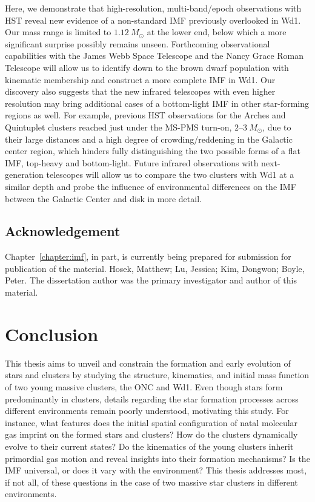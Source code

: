 \documentclass[12pt]{ucsddissertation}
\begin{document}
\begin{CJK*}{UTF8}{gbsn}
Here, we demonstrate that high-resolution, multi-band/epoch observations with HST reveal new evidence of a non-standard IMF previously overlooked in Wd1. Our mass range is limited to $1.12~M_\odot$ at the lower end, below which a more significant surprise possibly remains unseen. Forthcoming observational capabilities with the James Webb Space Telescope and the Nancy Grace Roman Telescope will allow us to identify down to the brown dwarf population with kinematic membership and construct a more complete IMF in Wd1. Our discovery also suggests that the new infrared telescopes with even higher resolution may bring additional cases of a bottom-light IMF in other star-forming regions as well. For example, previous HST observations for the Arches and Quintuplet clusters reached just under the MS-PMS turn-on, $2$--$3~M_\odot$, due to their large distances and a high degree of crowding/reddening in the Galactic center region, which hinders fully distinguishing the two possible forms of a flat IMF, top-heavy and bottom-light. Future infrared observations with next-generation telescopes will allow us to compare the two clusters with Wd1 at a similar depth and probe the influence of environmental differences on the IMF between the Galactic Center and disk in more detail.


\section*{Acknowledgement}
Chapter~\ref{chapter:imf}, in part, is currently being prepared for submission for publication of the material. Hosek, Matthew; Lu, Jessica; Kim, Dongwon; Boyle, Peter. The dissertation author was the primary investigator and author of this material.


\chapter{Conclusion}
\label{chapter:conclusion}

This thesis aims to unveil and constrain the formation and early evolution of stars and clusters by studying the structure, kinematics, and initial mass function of two young massive clusters, the ONC and Wd1. Even though stars form predominantly in clusters, details regarding the star formation processes across different environments remain poorly understood, motivating this study. For instance, what features does the initial spatial configuration of natal molecular gas imprint on the formed stars and clusters?  How do the clusters dynamically evolve to their current states? Do the kinematics of the young clusters inherit primordial gas motion and reveal insights into their formation mechanisms? Is the IMF universal, or does it vary with the environment? This thesis addresses most, if not all, of these questions in the case of two massive star clusters in different environments.



\end{CJK*}
\end{document}
